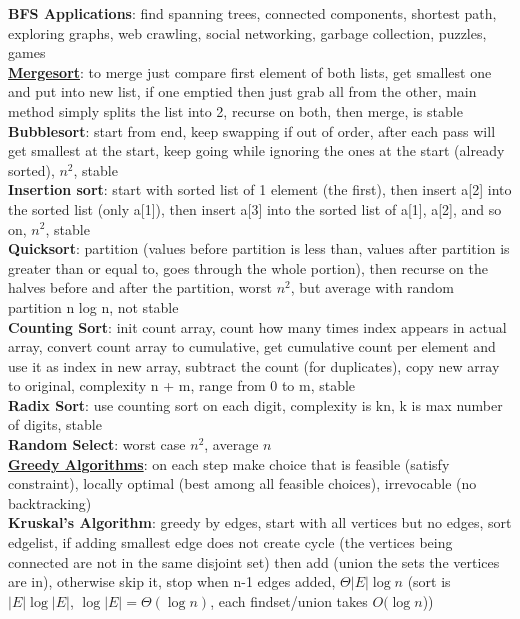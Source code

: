 \documentclass[a4paper]{article}
\begin{document}
\begin{multicols}{2}
        \textbf{BFS Applications}: find spanning trees, connected components, shortest path, exploring graphs, web crawling, social networking, garbage collection, puzzles, games\\
        \underline{\textbf{Mergesort}}: to merge just compare first element of both lists, get smallest one and put into new list, if one emptied then just grab all from the other, main method simply splits the list into 2, recurse on both, then merge, is stable\\
        \textbf{Bubblesort}: start from end, keep swapping if out of order, after each pass will get smallest at the start, keep going while ignoring the ones at the start (already sorted), $n^2$, stable\\
        \textbf{Insertion sort}: start with sorted list of 1 element (the first), then insert a[2] into the sorted list (only a[1]), then insert a[3] into the sorted list of a[1], a[2], and so on, $n^2$, stable\\
        \textbf{Quicksort}: partition (values before partition is less than, values after partition is greater than or equal to, goes through the whole portion), then recurse on the halves before and after the partition, worst $n^2$, but average with random partition n log n, not stable\\
        \textbf{Counting Sort}: init count array, count how many times index appears in actual array, convert count array to cumulative, get cumulative count per element and use it as index in new array, subtract the count (for duplicates), copy new array to original, complexity n + m, range from 0 to m, stable\\
        \textbf{Radix Sort}: use counting sort on each digit, complexity is kn, k is max number of digits, stable\\
        \textbf{Random Select}: worst case $n^2$, average $n$\\
        \underline{\textbf{Greedy Algorithms}}: on each step make choice that is feasible (satisfy constraint), locally optimal (best among all feasible choices), irrevocable (no backtracking)\\
        \textbf{Kruskal's Algorithm}: greedy by edges, start with all vertices but no edges, sort edgelist, if adding smallest edge does not create cycle (the vertices being connected are not in the same disjoint set) then add (union the sets the vertices are in), otherwise skip it, stop when n-1 edges added, $\Theta |E| \log n$ (sort is $|E| \log |E|$, $\log |E| = \Theta (\log n)$, each findset/union takes $O(\log n$))\\

\end{multicols}
\end{document}
